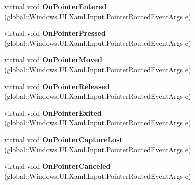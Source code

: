 \begin{DoxyCompactItemize}
virtual void {\bfseries On\+Pointer\+Entered} (global\+::\+Windows.\+U\+I.\+Xaml.\+Input.\+Pointer\+Routed\+Event\+Args e)
\item 
\mbox{\label{class_windows_1_1_u_i_1_1_xaml_1_1_controls_1_1_control_a72d13df130e7f9b6c8cc7fbbf022be49}} 
virtual void {\bfseries On\+Pointer\+Pressed} (global\+::\+Windows.\+U\+I.\+Xaml.\+Input.\+Pointer\+Routed\+Event\+Args e)
\item 
\mbox{\label{class_windows_1_1_u_i_1_1_xaml_1_1_controls_1_1_control_ae671c763ce297220751cee1945c9265b}} 
virtual void {\bfseries On\+Pointer\+Moved} (global\+::\+Windows.\+U\+I.\+Xaml.\+Input.\+Pointer\+Routed\+Event\+Args e)
\item 
\mbox{\label{class_windows_1_1_u_i_1_1_xaml_1_1_controls_1_1_control_a1a16d49c087d495de68e1f9953a4ebfd}} 
virtual void {\bfseries On\+Pointer\+Released} (global\+::\+Windows.\+U\+I.\+Xaml.\+Input.\+Pointer\+Routed\+Event\+Args e)
\item 
\mbox{\label{class_windows_1_1_u_i_1_1_xaml_1_1_controls_1_1_control_a57ecaf6968ada920336dd8afd70ad576}} 
virtual void {\bfseries On\+Pointer\+Exited} (global\+::\+Windows.\+U\+I.\+Xaml.\+Input.\+Pointer\+Routed\+Event\+Args e)
\item 
\mbox{\label{class_windows_1_1_u_i_1_1_xaml_1_1_controls_1_1_control_a2f9ad5125fbed9d126ebcfd2b0fe794c}} 
virtual void {\bfseries On\+Pointer\+Capture\+Lost} (global\+::\+Windows.\+U\+I.\+Xaml.\+Input.\+Pointer\+Routed\+Event\+Args e)
\item 
\mbox{\label{class_windows_1_1_u_i_1_1_xaml_1_1_controls_1_1_control_a94fec4012722a7b1310cbc30233b7940}} 
virtual void {\bfseries On\+Pointer\+Canceled} (global\+::\+Windows.\+U\+I.\+Xaml.\+Input.\+Pointer\+Routed\+Event\+Args e)
\item 
\mbox{\label{class_windows_1_1_u_i_1_1_xaml_1_1_controls_1_1_control_a05f4eb2e6e829dbc04ce27f21650e77d}} 

\end{DoxyCompactItemize}
